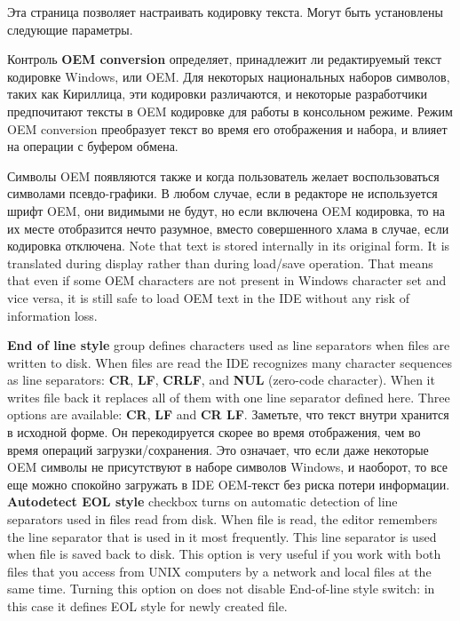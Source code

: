\else
Эта страница позволяет настраивать кодировку текста. Могут быть установлены
следующие параметры.

Контроль {\bf OEM conversion} определяет, принадлежит ли редактируемый текст
кодировке Windows, или OEM. Для некоторых национальных наборов символов, таких
как Кириллица, эти кодировки различаются, и некоторые разработчики предпочитают
тексты в OEM кодировке для работы в консольном режиме.
Режим OEM conversion преобразует текст во время его отображения и набора, и влияет
на операции с буфером обмена.

Символы OEM появляются также и когда пользователь желает воспользоваться символами
псевдо-графики. В любом случае, если в редакторе не используется шрифт OEM, они
видимыми не будут, но если включена OEM кодировка, то на их месте отобразится нечто
разумное, вместо совершенного хлама в случае, если кодировка отключена.
\fi
\ifenglish
Note that text is stored internally in its original form. It is translated during display
rather than during load/save operation. That means that even if some OEM characters
are not present in Windows character set and vice versa, it is still safe to load
OEM text in the IDE without any risk of information loss.

{\bf End of line style} group defines characters used as line separators when
files are written to disk. When files are read the IDE recognizes many character
sequences as line separators: {\bf CR}, {\bf LF}, {\bf CRLF}, and {\bf NUL}
(zero-code character). When it writes file back it replaces all of them with
one line separator defined here. Three options are available: {\bf CR}, {\bf LF}
and {\bf CR LF}.
\else
Заметьте, что текст внутри хранится в исходной форме. Он перекодируется скорее во
время отображения, чем во время операций загрузки/сохранения. Это означает, что
если даже некоторые OEM символы не присутствуют в наборе символов Windows,
и наоборот, то все еще можно спокойно загружать в IDE OEM-текст без риска
потери информации.
\fi
\ifenglish
{\bf Autodetect EOL style} checkbox turns on automatic detection of line separators
used in files read from disk. When file is read, the editor remembers the line
separator that is used in it most frequently. This line separator is used when file
is saved back to disk. This option is very useful if you work with both files that
you access from UNIX computers by a network and local files at the same time.
Turning this option on does not disable End-of-line style switch: in this case
it defines EOL style for newly created file.

